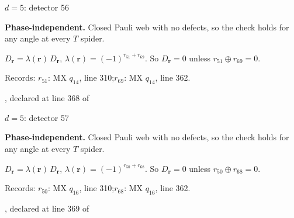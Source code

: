 \label{d5_det056}
{\Large $d=5$: detector 56}\par
\textbf{Phase-independent.} Closed Pauli web with no defects, so the check holds for any angle at every $T$ spider.
\begin{center}
\end{center}
\vspace{-1mm}
$D_{\boldsymbol r}=\lambda(\boldsymbol r)\,D_{\boldsymbol r}$, \quad $\lambda(\boldsymbol r)=(-1)^{r_{51}+r_{69}}$. \qquad So $D_{\boldsymbol r}=0$ unless $r_{51}\oplus r_{69}=0$.
\par\smallskip\begin{minipage}{.98\linewidth}\small Records: $r_{51}$: MX $q_{14}$, line 310;\quad $r_{69}$: MX $q_{14}$, line 362.\end{minipage}
\vfill
{\footnotesize\texttt{}, declared at line 368 of \texttt{}}
\newpage

\label{d5_det057}
{\Large $d=5$: detector 57}\par
\textbf{Phase-independent.} Closed Pauli web with no defects, so the check holds for any angle at every $T$ spider.
\begin{center}
\end{center}
\vspace{-1mm}
$D_{\boldsymbol r}=\lambda(\boldsymbol r)\,D_{\boldsymbol r}$, \quad $\lambda(\boldsymbol r)=(-1)^{r_{50}+r_{68}}$. \qquad So $D_{\boldsymbol r}=0$ unless $r_{50}\oplus r_{68}=0$.
\par\smallskip\begin{minipage}{.98\linewidth}\small Records: $r_{50}$: MX $q_{16}$, line 310;\quad $r_{68}$: MX $q_{16}$, line 362.\end{minipage}
\vfill
{\footnotesize\texttt{}, declared at line 369 of \texttt{}}
\newpage

